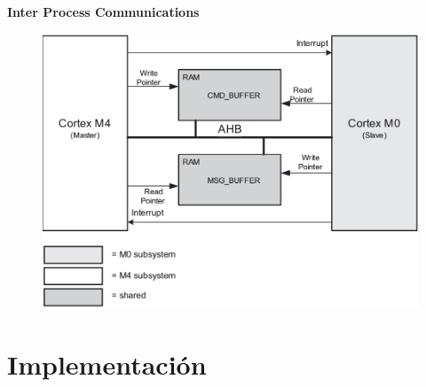 \documentclass[11pt]{beamer}
\begin{document}
\begin{frame}{\textbf{\LARGE{Inter Process Communications}}}
	\vspace{-.7cm}
	\begin{figure}[H]
		\includegraphics[height=.8\textheight]{./imagenes/IPC.png}
	\end{figure}	
\end{frame}


\section{Implementación}
\end{document}
